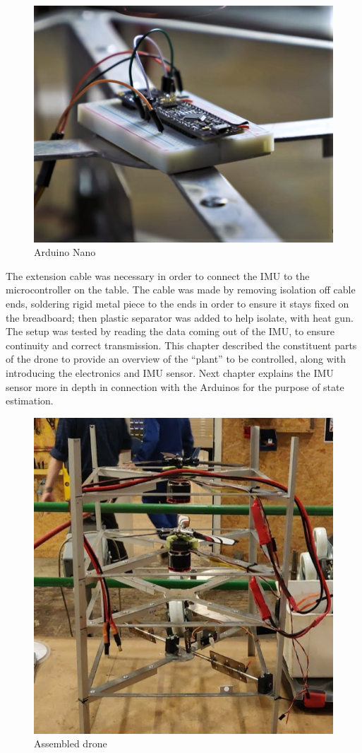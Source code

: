 \begin{figure}[h]
  \centering
  \includegraphics[scale=0.3]{graphics/Drone/ArduinoNano2.png}
  \caption{Arduino Nano}
  \label{fig:Arduino Nano}
\end{figure}


The extension cable was necessary in order to connect the IMU to the microcontroller on the table. 
The cable was made by removing isolation off cable ends, soldering rigid metal piece to the ends in order to ensure it stays fixed on the breadboard; then plastic separator was added to help isolate, with heat gun.
The setup was tested by reading the data coming out of the IMU, to ensure continuity and correct transmission. 
This chapter described the constituent parts of the drone to provide an overview of the “plant” to be controlled, along with introducing the electronics and IMU sensor. Next chapter explains the IMU sensor more in depth in connection with the Arduinos for the purpose of state estimation. 


\begin{figure}[h]
  \centering
  \includegraphics[scale=0.7]{graphics/Drone/droneBuilt.png}
  \caption{Assembled drone}
  \label{fig:Assembled drone}
\end{figure}